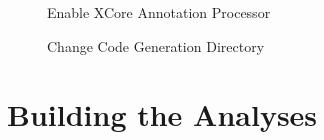          \begin{figure}
             \centering
             \caption{Enable XCore Annotation Processor}
             \label{fig:enableSpecificSettings}
        \end{figure}    

         \begin{figure}
             \centering
             \caption{Change Code Generation Directory}
             \label{fig:modifySourceDir}
        \end{figure}    


\section{Building the Analyses}

